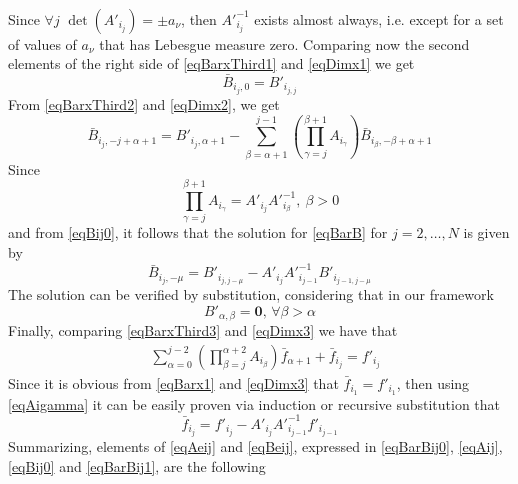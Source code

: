 \documentclass[]{ifacconf}  %
\begin{document}
\begin{pf}
\begin{align}
	\end{align}
	\normalsize
	Since $\forall j$ $\det(A'_{i_j}) = \pm a_\nu$, then $A'^{-1}_{i_j}$ exists almost always, i.e. except for a set of values of $a_\nu$ that has Lebesgue measure zero. 
	Comparing now the second elements of the right side of \eqref{eqBarxThird1} and \eqref{eqDimx1} we get
	\small
	\begin{equation}\label{eqBij0}
	\bar B_{i_j,0}=B'_{i_{j,j}}
	\end{equation}
	\normalsize
	From \eqref{eqBarxThird2} and \eqref{eqDimx2}, we get
	\small
	\begin{equation}\label{eqBarB}
	\bar B_{i_j,-j+\alpha+1} = B'_{i_j,\alpha+1} - \sum_{\beta=\alpha+1}^{j-1}{\left(\prod_{\gamma=j}^{\beta+1}{A_{i_\gamma}}\right)\bar B_{i_{\beta},-\beta+\alpha+1}}
	\end{equation}
	\normalsize
	Since 
	\small
	\begin{equation}\label{eqAigamma}
	\prod_{\gamma=j}^{\beta+1}{A_{i_\gamma}}=A'_{i_j}A'^{-1}_{i_\beta},\ \beta > 0
	\end{equation}
	\normalsize
	and from \eqref{eqBij0}, it follows that the solution for \eqref{eqBarB} for $j=2,\ldots,N$ is given by
	\small
	\begin{equation}\label{eqBarBij1}
	\bar B_{i_j,-\mu} = B'_{i_{j,j-\mu}} - A'_{i_j}A'^{-1}_{i_{j-1}}B'_{i_{j-1,j-\mu}}
	\end{equation}
	\normalsize
	The solution can be verified by substitution, considering that in our framework
	\small
	\begin{equation}
	B'_{\alpha,\beta}=\mathbf{0},\,\forall\beta>\alpha
	\end{equation}
	\normalsize
	Finally, comparing \eqref{eqBarxThird3} and \eqref{eqDimx3} we have that
	\small
	\begin{align}
	&\sum_{\alpha=0}^{j-2}{\left(\prod_{\beta=j}^{\alpha + 2}{A_{i_\beta}}\right)\bar f_{\alpha+1}} + \bar f_{i_j} = f'_{i_j}
	\end{align}
	\normalsize
	Since it is obvious from \eqref{eqBarx1} and \eqref{eqDimx3} that $\bar f_{i_1}=f'_{i_1}$, then using \eqref{eqAigamma} it can be easily proven via induction or recursive substitution that
	\small
	\begin{equation}\label{eqBarfij}
	\bar f_{i_j} = f'_{i_j} -A'_{i_j}A'^{-1}_{i_{j-1}}f'_{i_{j-1}}
	\end{equation}
	\normalsize
	Summarizing, elements of \eqref{eqAeij} and \eqref{eqBeij}, expressed in \eqref{eqBarBij0}, \eqref{eqAij}, \eqref{eqBij0} and \eqref{eqBarBij1}, are the following

\end{pf}
\end{document}
